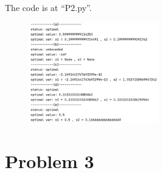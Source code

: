 \documentclass{article}
\begin{document}
\newpage
The code is at ``P2.py''.
\begin{figure}[h]
	\centering
	\includegraphics[width=0.5\textwidth]{p2-Rslt.png}
\end{figure}


\section*{Problem 3}
\end{document}
